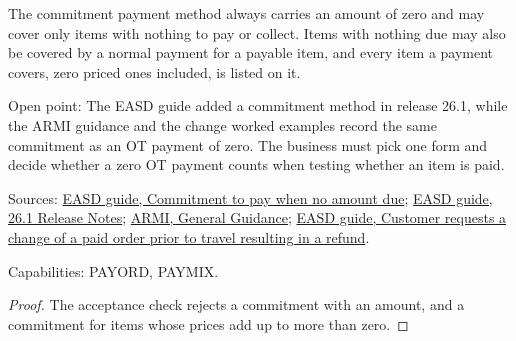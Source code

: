 \begin{theorem}
  \label{thm:payment-commitment-zero-due}
  The commitment payment method always carries an amount of zero and may
  cover only items with nothing to pay or collect. Items with nothing due
  may also be covered by a normal payment for a payable item, and every item
  a payment covers, zero priced ones included, is listed on it.

  Open point: The EASD guide added a commitment method in release 26.1,
  while the ARMI guidance and the change worked examples record the same
  commitment as an OT payment of zero. The business must pick one form and
  decide whether a zero OT payment counts when testing whether an item is
  paid.

  Sources: \href{https://standards.atlassian.net/wiki/spaces/EASD/pages/2593488900/Commitment+to+pay+when+no+amount+due}{EASD guide, Commitment to pay when no amount due};
  \href{https://standards.atlassian.net/wiki/spaces/EASD/pages/2533031964/26.1+Release+Notes}{EASD guide, 26.1 Release Notes};
  \href{https://standards.atlassian.net/wiki/spaces/ARMI/pages/584318980/General+Guidance}{ARMI, General Guidance};
  \href{https://standards.atlassian.net/wiki/spaces/EASD/pages/842268768/Customer+requests+a+change+of+a+paid+order+prior+to+travel+resulting+in+a+refund}{EASD guide, Customer requests a change of a paid order prior to travel resulting in a refund}.

  Capabilities: PAYORD, PAYMIX.
\end{theorem}
\begin{proof}
  The acceptance check rejects a commitment with an amount, and a commitment
  for items whose prices add up to more than zero.
\end{proof}

